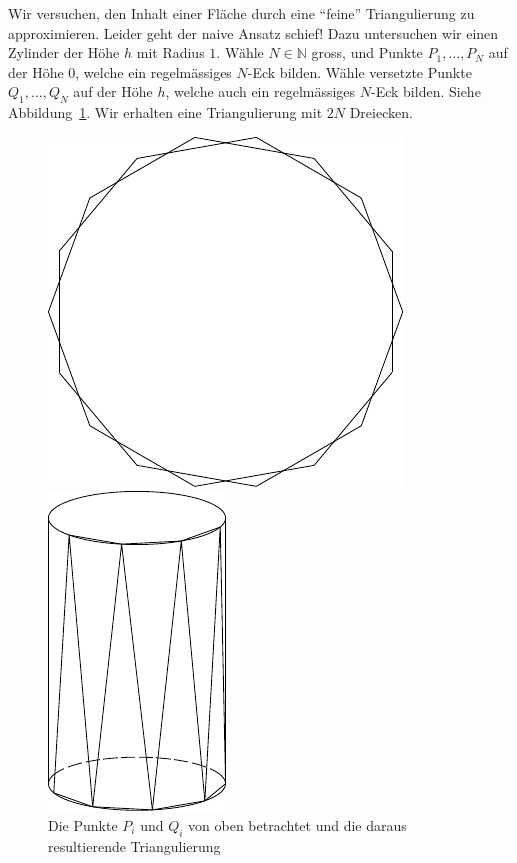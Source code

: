\documentclass[../main.tex]{subfiles}
\begin{document}
\begin{example}
  Wir versuchen, den Inhalt einer Fläche durch eine
  ``feine'' Triangulierung zu approximieren.
  Leider geht der naive Ansatz schief!
  Dazu untersuchen wir 
  einen Zylinder der Höhe $h$ mit Radius $1$.
  Wähle $N \in \mathbb{N}$ gross,
  und Punkte $P_1, \dots, P_N$ auf der Höhe $0$,
  welche ein regelmässiges $N$-Eck bilden.
  Wähle versetzte Punkte $Q_1, \dots, Q_N$ auf der Höhe $h$,
  welche auch ein regelmässiges $N$-Eck bilden.
  Siehe Abbildung~\ref{fig:n-gons}.
  Wir erhalten eine Triangulierung
  mit $2N$ Dreiecken.

\begin{figure}[htb] 
  \centering
  \begin{minipage}{0.50\textwidth}
    \centering
    \includegraphics{figures/n-gons}
  \end{minipage}%
  \begin{minipage}{0.50\textwidth}
    \centering
    \includegraphics{figures/triangulation}
  \end{minipage}%
   \caption{Die Punkte $P_i$ und $Q_i$ von oben betrachtet
   und die daraus resultierende Triangulierung}%
   \label{fig:n-gons}
\end{figure}


\end{example}
\end{document}
